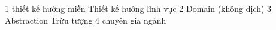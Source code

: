 


1 thiết kế hướng miền
Thiết kế hướng lĩnh vực
2 Domain (không dịch)
3 Abstraction Trừu tượng
4 chuyên gia ngành